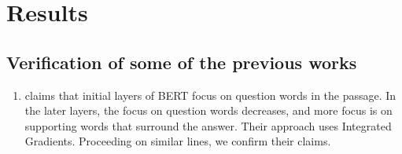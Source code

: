 \documentclass[10pt,twocolumn,letterpaper]{article}
\begin{document}
\section{Results}
\subsection{Verification of some of the previous works}
\begin{enumerate}
    \item \cite{bert_for_qa} claims that initial layers of BERT focus on question words in the passage. In the later layers, the focus on question words decreases, and more focus is on supporting words that surround the answer. Their approach uses Integrated Gradients. Proceeding on similar lines, we confirm their claims.
\end{enumerate}
\end{document}
